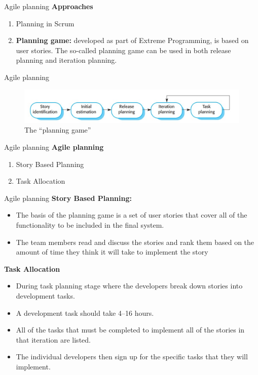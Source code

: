 \documentclass{beamer}
\begin{document}
\begin{frame}{Agile planning}
	\textbf{Approaches}
	\begin{enumerate}
		\item Planning in Scrum
		
		\item \textbf{Planning game:} developed as part of Extreme Programming, is based on user stories. The so-called 
		planning game can be used in both release planning and iteration planning.
	\end{enumerate}
\end{frame}
\begin{frame}{Agile planning}
	\begin{figure}
	\includegraphics[scale=.5]{img/m4_7}
	\caption{The “planning game”}
\end{figure}
\end{frame}
\begin{frame}{Agile planning}
	\textbf{Agile planning}
	\begin{enumerate}
		\item Story Based Planning
		\item Task Allocation
	\end{enumerate}
\end{frame}
\begin{frame}{Agile planning}
\textbf{Story Based Planning:}
\begin{itemize}
	\item The basis of the planning game is a set of user stories that cover all of the functionality to be included 
	in the final system.
	\item The team members read and discuss the stories and rank them based on the amount of time they think 
	it will take to implement the story
\end{itemize}
\textbf{Task Allocation}
\begin{itemize}
	\item During task planning stage where the developers break down stories into development tasks.
	\item A development task should take 4–16 hours. 
	\item All of the tasks that must be completed to implement all of the stories in that iteration are listed. 
	\item The individual developers then sign up for the specific tasks that they will implement.
\end{itemize}
\end{frame}
\end{document}
